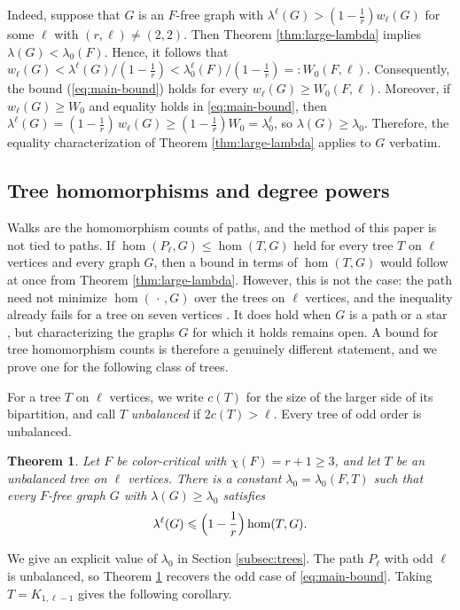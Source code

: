 \documentclass[11pt, a4paper]{article}
\newtheorem{theorem}{Theorem}[section]
\theoremstyle{definition}
\theoremstyle{plain}
\renewcommand{\le}{\leqslant}
\renewcommand{\ge}{\geqslant}
\begin{document}
Indeed, suppose that $G$ is an $F$-free graph with $\lambda^\ell(G) > \left( 1- \frac{1}{r}\right)w_\ell(G)$ for some $\ell $ with $(r, \ell) \neq (2,2)$. 
Then Theorem \ref{thm:large-lambda} implies  $\lambda (G)<\lambda_0 (F)$. 
Hence, it follows that  $w_\ell (G) < \lambda^{\ell}(G)/ (1- \frac{1}{r})  <\lambda_0^{\ell}(F) /(1-\frac1r) =:W_0(F,\ell)$. 
Consequently, the bound (\ref{eq:main-bound}) holds for every $w_{\ell}(G)\ge W_0(F,\ell)$.   
Moreover, if $w_\ell (G)\ge W_0$ and  
equality holds in \eqref{eq:main-bound}, then
$\lambda^{\ell}(G)=(1-\frac1r)\, w_\ell (G)
 \ge (1-\frac1r)W_0=\lambda_0^{\ell}$, so
$\lambda (G)\ge \lambda_0$. Therefore, the equality characterization of Theorem \ref{thm:large-lambda} applies to $G$ verbatim. 



\subsection{Tree homomorphisms and degree powers}


Walks are the homomorphism counts of paths, 
and the method of this paper is not tied to paths.  
If $ \hom (P_\ell ,G)\le \hom (T,G)$ held for every tree $T$ on $\ell$ vertices and every graph $G$, 
then a bound in terms of $\hom (T,G)$ 
would follow at once
 from Theorem \ref{thm:large-lambda}. 
However, this is not the case: the path need not
minimize $\hom (\,\cdot\,,G)$ over the trees on $\ell$ vertices, and the inequality already fails for a tree on seven vertices \cite{CL2014}. It does
hold when $G$ is a path or a star \cite{CL2015}, but characterizing the graphs $G$ for which it holds remains open. 
A bound for tree homomorphism counts is
therefore a genuinely different statement, 
and we prove one for the following class of trees. 

\smallskip 
For a tree $T$ on $\ell$ vertices, 
we write $c(T)$ for the size of the larger side
of its bipartition, and call $T$ \emph{unbalanced} if $2c(T)>\ell$. Every tree of odd order is unbalanced.

\begin{theorem}\label{thm:tree-intro}
Let $F$ be color-critical with $\chi (F)=r+1\ge 3$, and let $T$ be an unbalanced tree on $\ell$ vertices. There is a constant
$\lambda_0=\lambda_0(F,T)$ such that every $F$-free graph $G$ with
$\lambda (G)\ge \lambda_0$ satisfies
\[
  \lambda^{\ell}(G)\le \Bigl(1-\frac1r\Bigr)\hom (T,G).
\]
\end{theorem}

We give an explicit value of $\lambda_0$ in Section
\ref{subsec:trees}. 
The path $P_\ell$ with odd $\ell$ is
unbalanced, so Theorem \ref{thm:tree-intro} recovers the odd case of \eqref{eq:main-bound}. Taking $T=K_{1,\ell -1}$
 gives the following corollary.
 
\end{document}

